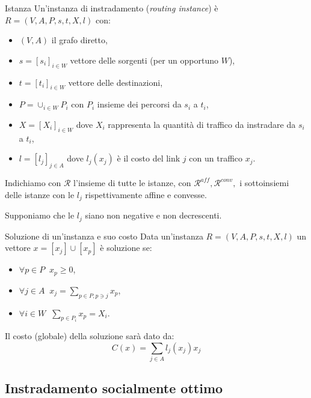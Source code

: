 \documentclass{beamer}
\theoremstyle{plain}
\theoremstyle{definition}
\theoremstyle{remark}
\newcommand{\bra}[1]{\left[#1\right]}
\begin{document}
\begin{frame}{Istanza}
  Un'instanza di instradamento (\textit{routing instance}) è
  $R=(V,A,P,s,t,X,l)$ con:
  \begin{itemize}
  \item $(V,A)$ il grafo diretto,
  \item $s = \bra{s_i}_{i\in W}$ vettore delle sorgenti (per un opportuno $W$),
  \item $t = \bra{t_i}_{i\in W}$ vettore delle destinazioni,
  \item $P = \cup _{i\in W} P_i$ con $P_i$ insieme dei
    percorsi da $s_i$ a $t_i$,
  \item $X = \bra{X_i}_{i\in W}$ dove $X_i$ rappresenta la quantità di
    traffico da instradare da $s_i$ a $t_i$,
  \item $l = \bra{l_j}_{j\in A}$ dove $l_j(x_j)$ è il costo del link
    $j$ con un traffico $x_j$.
  \end{itemize}
  
  Indichiamo con $\mathcal{R}$ l'insieme di tutte le istanze, con
  $\mathcal{R}^{aff},\mathcal{R}^{conv},$ i sottoinsiemi delle istanze con
  le $l_j$ rispettivamente affine e convesse.

  Supponiamo che le $l_j$ siano non negative e non decrescenti.
\end{frame}

\begin{frame}{Soluzione di un'instanza e suo costo}
  Data un'instanza $R=(V,A,P,s,t,X,l)$ un vettore
  $x = \bra{x_j} \cup \bra{x_p}$ è soluzione se:
  \begin{itemize}
  \item $\displaystyle \forall p\in P\;\; x_p \ge 0$,
  \item $\displaystyle \forall j\in A\;\; x_j = \sum_{p\in P,p\ni j} x_p$,
  \item $\displaystyle \forall i\in W\;\; \sum_{p\in P_i} x_p = X_i$.
  \end{itemize}
  
  Il costo (globale) della soluzione sarà dato da:
  \[ C(x) = \sum_{j\in A} l_j(x_j)x_j \]
\end{frame}

\subsection{Instradamento socialmente ottimo}
\end{document}
